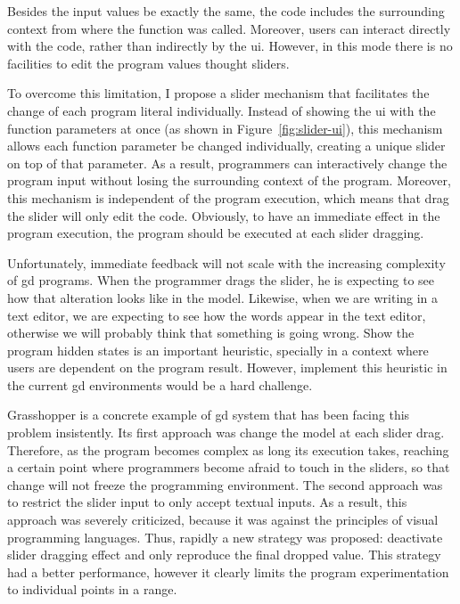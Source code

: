 Besides the input values be exactly the same, the code includes the surrounding context from where the function was called. Moreover, users can interact directly with the code, rather than indirectly by the \gls{ui}. However, in this mode there is no facilities to edit the program values thought sliders.

To overcome this limitation, I propose a slider mechanism that facilitates the change of each program literal individually. Instead of showing the \gls{ui} with the function parameters at once (as shown in Figure~\ref{fig:slider-ui}), this mechanism allows each function parameter be changed individually, creating a unique slider on top of that parameter. As a result, programmers can interactively change the program input without losing the surrounding context of the program. Moreover, this mechanism is independent of the program execution, which means that drag the slider will only edit the code. Obviously, to have an immediate effect in the program execution, the program should be executed at each slider dragging.

Unfortunately, immediate feedback will not scale with the increasing complexity of \gls{gd} programs. When the programmer drags the slider, he is expecting to see how that alteration looks like in the model. Likewise, when we are writing in a text editor, we are expecting to see how the words appear in the text editor, otherwise we will probably think that something is going wrong. Show the program hidden states is an important heuristic, specially in a context where users are dependent on the program result. However, implement this heuristic in the current \gls{gd} environments would be a hard challenge.

Grasshopper is a concrete example of \gls{gd} system that has been facing this problem insistently. Its first approach was change the model at each slider drag. Therefore, as the program becomes complex as long its execution takes, reaching a certain point where programmers become afraid to touch in the sliders, so that change will not freeze the programming environment. The second approach was to restrict the slider input to only accept textual inputs. As a result, this approach was severely criticized, because it was against the principles of visual programming languages. Thus, rapidly a new strategy was proposed: deactivate slider dragging effect and only reproduce the final dropped value. This strategy had a better performance, however it clearly limits the program experimentation to individual points in a range.

